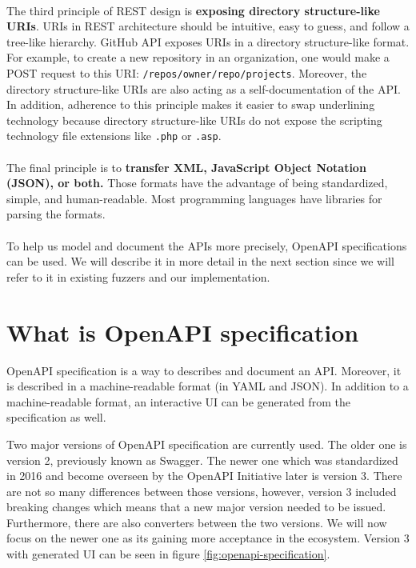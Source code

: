 \paragraph{}
The third principle of REST design is \textbf{exposing directory structure-like URIs}. URIs in REST architecture should be intuitive, easy to guess, and follow a tree-like hierarchy. GitHub API exposes URIs in a directory structure-like format. For example, to create a new repository in an organization, one would make a POST request to this URI: \texttt{/repos/{owner}/{repo}/projects}. Moreover, the directory structure-like URIs are also acting as a self-documentation of the API. In addition, adherence to this principle makes it easier to swap underlining technology because directory structure-like URIs do not expose the scripting technology file extensions like \texttt{.php} or \texttt{.asp}.

\paragraph{}
The final principle is to \textbf{transfer XML, JavaScript Object Notation (JSON), or both.} Those formats have the advantage of being standardized, simple, and human-readable. Most programming languages have libraries for parsing the formats.

\paragraph{}
To help us model and document the APIs more precisely, OpenAPI specifications can be used. We will describe it in more detail in the next section since we will refer to it in existing fuzzers and our implementation.


\section{What is OpenAPI specification}
\label{sec:openapi}
OpenAPI specification is a way to describes and document an API. Moreover, it is described in a  machine-readable format (in YAML and JSON). In addition to a machine-readable format, an interactive UI can be generated from the specification as well.

Two major versions of OpenAPI specification are currently used. The older one is version 2, previously known as Swagger. The newer one which was standardized in 2016 and become overseen by the OpenAPI Initiative \cite{openapi2020main} later is version 3. There are not so many differences between those versions, however, version 3 included breaking changes which means that a new major version needed to be issued. Furthermore, there are also converters between the two versions. We will now focus on the newer one as its gaining more acceptance in the ecosystem. Version 3 with generated UI can be seen in figure \ref{fig:openapi-specification}.

